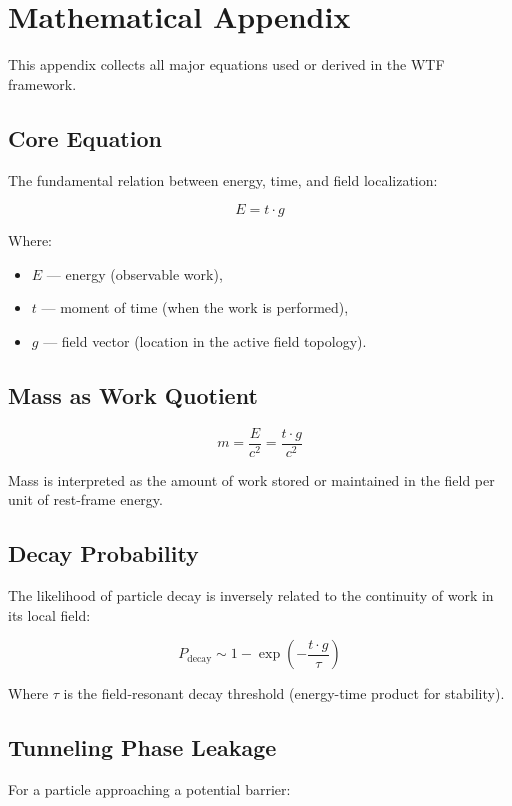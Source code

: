 \section{Mathematical Appendix}

This appendix collects all major equations used or derived in the WTF framework.

\subsection{Core Equation}

The fundamental relation between energy, time, and field localization:

\[
E = t \cdot g
\]

Where:
\begin{itemize}
    \item \( E \) — energy (observable work),
    \item \( t \) — moment of time (when the work is performed),
    \item \( g \) — field vector (location in the active field topology).
\end{itemize}

\subsection{Mass as Work Quotient}

\[
m = \frac{E}{c^2} = \frac{t \cdot g}{c^2}
\]

Mass is interpreted as the amount of work stored or maintained in the field per unit of rest-frame energy.

\subsection{Decay Probability}

The likelihood of particle decay is inversely related to the continuity of work in its local field:

\[
P_{\text{decay}} \sim 1 - \exp\left(-\frac{t \cdot g}{\tau}\right)
\]

Where \( \tau \) is the field-resonant decay threshold (energy-time product for stability).

\subsection{Tunneling Phase Leakage}

For a particle approaching a potential barrier:

